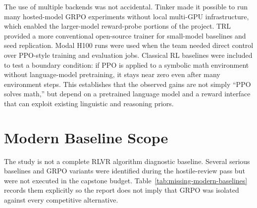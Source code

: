 \documentclass[12pt,a4paper]{report}
\begin{document}
The use of multiple backends was not accidental. Tinker made it possible to run many hosted-model GRPO experiments without local multi-GPU infrastructure, which enabled the larger-model reward-probe portions of the project. TRL provided a more conventional open-source trainer for small-model baselines and seed replication. Modal H100 runs were used when the team needed direct control over PPO-style training and evaluation jobs. Classical RL baselines were included to test a boundary condition: if PPO is applied to a symbolic math environment without language-model pretraining, it stays near zero even after many environment steps. This establishes that the observed gains are not simply ``PPO solves math,'' but depend on a pretrained language model and a reward interface that can exploit existing linguistic and reasoning priors.

\section{Modern Baseline Scope}
\label{sec:modern-baseline-scope}

The study is not a complete RLVR algorithm diagnostic baseline. Several serious baselines and GRPO variants were identified during the hostile-review pass but were not executed in the capstone budget. Table~\ref{tab:missing-modern-baselines} records them explicitly so the report does not imply that GRPO was isolated against every competitive alternative.
\end{document}

